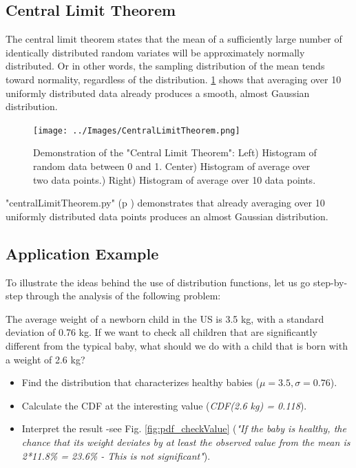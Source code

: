 \subsection{Central Limit Theorem}\label{sec:CentralLimitTheorem}
The central limit theorem states that the mean of a sufficiently large number of identically distributed random variates will be approximately normally distributed. Or in other words, the sampling distribution of the mean tends toward normality, regardless of the distribution.
\ref{fig:CentralLimitTheorem} shows that averaging over 10 uniformly distributed data already produces a smooth, almost Gaussian distribution.

\begin{figure}
  \centering
  \texttt{[image: ../Images/CentralLimitTheorem.png]}\\
  \caption{Demonstration of the "Central Limit Theorem": Left) Histogram of random data between 0 and 1. Center) Histogram of average over two data points.) Right) Histogram of average over 10 data points.}\label{fig:CentralLimitTheorem}
\end{figure}

\PyImg "centralLimitTheorem.py" (p \pageref{py:centralLimitTheorem}) demonstrates that already averaging over 10 uniformly distributed data points produces an almost Gaussian distribution.

\subsection{Application Example}

To illustrate the ideas behind the use of distribution functions, let us go step-by-step through the analysis of the following problem:

The average weight of a newborn child in the US is 3.5 kg, with a standard deviation of 0.76 kg. If we want to check all children that are significantly different from the typical baby, what should we do with a child that is born with a weight of 2.6 kg?

\begin{itemize}
  \item Find the distribution that characterizes healthy babies ($\mu=3.5, \sigma=0.76$).
  \item Calculate the CDF at the interesting value (\emph{CDF(2.6 kg) = 0.118}).
  \item Interpret the result -see Fig. \ref{fig:pdf_checkValue} (\emph{"If the baby is healthy, the chance that its weight deviates by at least the observed value from the mean is 2*11.8\% = 23.6\% - This is not significant"}).
\end{itemize}

